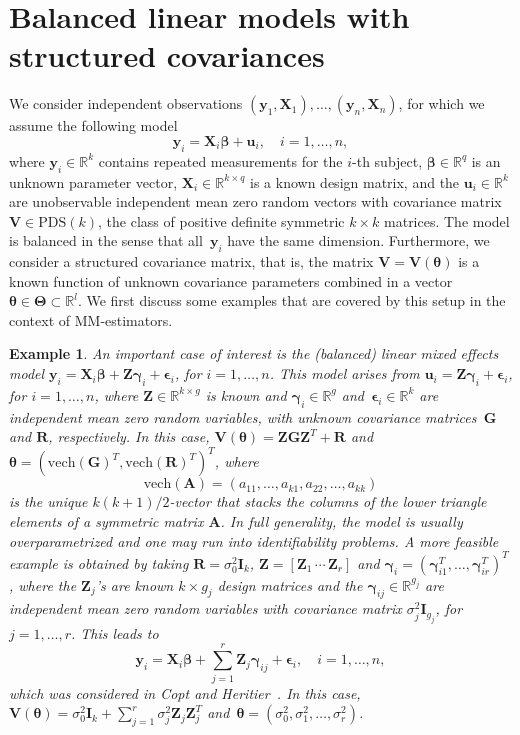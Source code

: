 \documentclass{article}
\numberwithin{equation}{section}
\theoremstyle{plain}
\newtheorem{example}{Example}
\newcommand{\R}{\mathbb{R}}
\newcommand{\vch}{\mathrm{vech}}
\newcommand{\bbeta}{\bm\beta}
\newcommand{\beps}{\bm\epsilon}
\newcommand{\btheta}{\bm\theta}
\newcommand{\bgamma}{\bm\gamma}
\newcommand{\bTheta}{\bm\Theta}
\newcommand{\by}{\mathbf{y}}
\newcommand{\bu}{\mathbf{u}}
\newcommand{\bX}{\mathbf{X}}
\newcommand{\bV}{\mathbf{V}}
\newcommand{\bG}{\mathbf{G}}
\newcommand{\bZ}{\mathbf{Z}}
\newcommand{\bI}{\mathbf{I}}
\newcommand{\bA}{\mathbf{A}}
\newcommand{\bR}{\mathbf{R}}
\begin{document}
\section{Balanced linear models with structured covariances}
\label{sec:structured covariance model}
We consider independent observations $(\by_1,\bX_1),\ldots,(\by_n,\bX_n)$,
for which we assume the following model
\begin{equation}
\label{def:model}
\by_i
=
\bX_i\bbeta+\bu_i,
\quad
i=1,\ldots,n,
\end{equation}
where $\by_i\in\R^{k}$ contains repeated measurements for the $i$-th subject,
$\bbeta\in\R^q$ is an unknown parameter vector,
$\bX_i\in\R^{k\times q}$ is a known design matrix, and
the $\mathbf{u}_i\in\R^{k}$ are unobservable independent mean zero random vectors with
covariance matrix $\bV\in\text{PDS}(k)$,
the class of positive definite symmetric $k\times k$ matrices.
The model is balanced in the sense that all~$\mathbf{y}_i$ have the same dimension.
Furthermore, we consider a structured covariance matrix, that is,
the matrix $\bV=\bV(\btheta)$ is a known function of unknown covariance parameters combined in a vector 
$\btheta\in\mathbf{\bTheta}\subset\R^l$.
We first discuss some examples that are covered by this setup
in the context of MM-estimators.

\begin{example}
\label{ex:LME model}
An important case of interest is the (balanced) linear mixed effects model
$\by_i=\bX_i\bbeta+\bZ\bgamma_i+\beps_i$, for
$i=1,\ldots,n$.
This model arises from $\mathbf{u}_i=\mathbf{Z}\bgamma_i+\beps_i$,
for $i=1,\ldots,n$,
where $\mathbf{Z}\in\R^{k\times g}$ is known and $\bgamma_i\in\R^g$ and~$\beps_i\in\R^k$ are independent mean zero random variables, with
unknown covariance matrices~$\mathbf{G}$ and $\bR$, respectively.
In this case, $\bV(\btheta)=\bZ\bG\bZ^T+\bR$ and
$\btheta=(\vch(\bG)^T,\vch(\bR)^T)^T$,
where
\begin{equation}
\label{def:vech}
\vch(\bA)=(a_{11},\ldots,a_{k1},a_{22},\ldots,a_{kk})
\end{equation}
is the unique $k(k+1)/2$-vector that stacks the columns of the lower triangle elements of a symmetric matrix $\bA$.
In full generality, the model is usually overparametrized and one may run into identifiability problems.
A more feasible example is obtained by taking $\bR=\sigma_0^2\bI_k$,
$\bZ=\left[\bZ_1 \,\cdots\,\bZ_r\right]$ and
$\bgamma_i=(\bgamma_{i1}^T,\ldots,\bgamma_{ir}^T)^T$,
where the $\bZ_j$'s are known $k\times g_j$ design matrices and
the $\bgamma_{ij}\in\R^{g_j}$ are independent mean zero random variables with covariance matrix $\sigma_j^2\bI_{g_j}$,
for $j=1,\ldots,r$.
This leads to
\begin{equation}
\label{def:linear mixed effects model Copt}
\by_i=\bX_i\bbeta+\sum_{j=1}^r \bZ_j\bgamma_{ij}+\beps_i,
\quad
i=1,\ldots,n,
\end{equation}
which was considered in Copt and Heritier~\cite{copt&heritier2007}.
In this case, $\bV(\btheta)=\sigma_0^2\bI_k+\sum_{j=1}^r\sigma_j^2\bZ_j\bZ_j^T$ 
and~$\btheta=(\sigma_0^2,\sigma_1^2,\ldots,\sigma_r^2)$.
\end{example}
\end{document}

